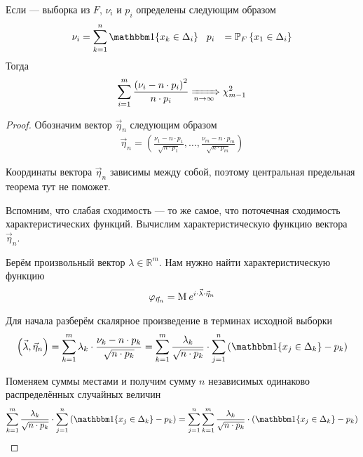 \begin{theorem}
  Если \xsample --- выборка из $F$, $\nu_i$ и $p_i$ определены
  следующим образом
  \begin{align*}
      \nu_i &= \sum_{k=1}^{n}\Indicator{x_k \in \Delta_i} \ \
      p_i &= \Probability[F]{x_1 \in \Delta_i}
  \end{align*}
  Тогда
  \begin{align*}
      \sum_{i=1}^{m}\frac{\left( \nu_i - n \cdot p_i \right)^2}{n \cdot p_i}
      \xRightarrow[n\to\infty]{} \chi_{m-1}^2
  \end{align*}
\end{theorem}
\begin{proof}
  Обозначим вектор $\vec{\eta}_n$ следующим образом
  \begin{align*}
      \vec{\eta}_n = \left( \frac{\nu_1 - n \cdot p_1}{\sqrt{n \cdot p_1}},
      \dots, \frac{\nu_m - n \cdot p_m}{\sqrt{n \cdot p_m}} \right)
  \end{align*}

  Координаты вектора $\vec{\eta}_n$ зависимы между собой, поэтому центральная
  предельная теорема тут не поможет.

  Вспомним, что слабая сходимость --- то же самое, что поточечная сходимость
  характеристических функций. Вычислим характеристическую функцию вектора
  $\vec{\eta}_n$.

  Берём произвольный вектор $\lambda \in \mathbb{R}^m$. Нам нужно найти
  характеристическую функцию
  \begin{align*}
      \varphi_{\vec{\eta}_n}
      = \operatorname{M}_{} e^{i \cdot \vec{\lambda} \cdot \vec{\eta}_n}
  \end{align*}

  Для начала разберём скалярное произведение в терминах исходной выборки
  \begin{align*}
      \left( \vec{\lambda}, \vec{\eta}_n \right)
      = \sum_{k=1}^{m} \lambda_k \cdot \frac{\nu_k - n \cdot p_k}{
          \sqrt{n \cdot p_k}}
      = \sum_{k=1}^{m}\frac{\lambda_k}{\sqrt{n \cdot p_k}}
      \cdot \sum_{j=1}^{n}\left(
          \Indicator{x_j \in \Delta_k} - p_k \right)
  \end{align*}

  Поменяем суммы местами и получим сумму $n$ независимых одинаково
  распределённых случайных величин
  \begin{align*}
      \sum_{k=1}^{m}\frac{\lambda_k}{\sqrt{n \cdot p_k}}
      \cdot \sum_{j=1}^{n}\left(
          \Indicator{x_j \in \Delta_k} - p_k \right)
      = \sum_{j=1}^{n}\sum_{k=1}^{m}\frac{\lambda_k}{\sqrt{n \cdot p_k}}
          \cdot \left( \Indicator{x_j \in \Delta_k} - p_k \right)
  \end{align*}


\end{proof}
